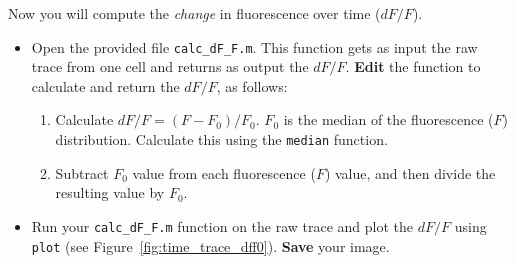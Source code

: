 \documentclass[paper=a4, fontsize=11pt]{article} %
\numberwithin{equation}{section} %
\numberwithin{figure}{section} %
\numberwithin{table}{section} %
\begin{document}
Now you will compute the \textit{change} in fluorescence over time ($dF/F$).
\begin{itemize}
\item Open the provided file \texttt{calc\_dF\_F.m}. This function gets as input the raw trace from one cell and returns as output the $dF/F$. \textbf{Edit} the function to calculate and return the $dF/F$, as follows:
  \begin{enumerate}
  \item Calculate $dF/F = (F-F_0)/F_0$. $F_0$ is the median of the fluorescence ($F$) distribution. Calculate this using the \texttt{median} function.
  \item Subtract $F_0$ value from each fluorescence ($F$) value, and then divide the resulting value by $F_0$.
  \end{enumerate}
\item Run your \texttt{calc\_dF\_F.m} function on the raw trace and plot the $dF/F$ using \texttt{plot} (see Figure~\ref{fig:time_trace_dff0}). \textbf{Save} your image.
\end{itemize}
\end{document}
